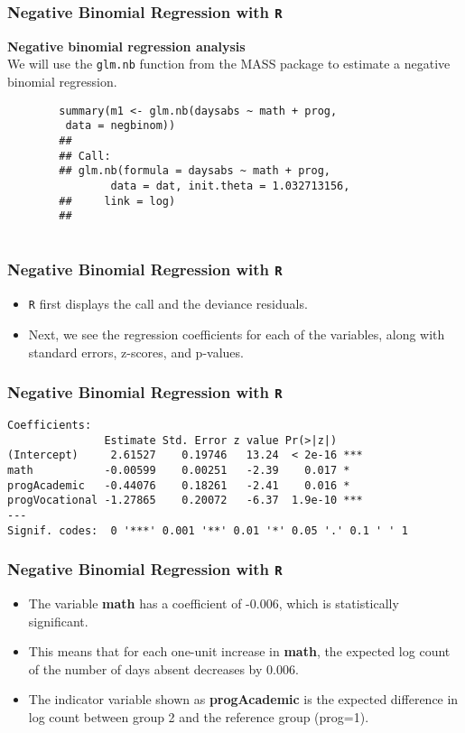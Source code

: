 \documentclass[MASTER.tex]{subfiles}
\begin{document}
\begin{frame}[fragile]
	\frametitle{Negative Binomial Regression with \texttt{R} }
	\large
\textbf{Negative binomial regression analysis}\\
	We will use the \texttt{glm.nb} function from the MASS package to estimate a negative binomial regression.
	\begin{verbatim}
		summary(m1 <- glm.nb(daysabs ~ math + prog, 
		 data = negbinom))
		## 
		## Call:
		## glm.nb(formula = daysabs ~ math + prog, 
		        data = dat, init.theta = 1.032713156, 
		##     link = log)
		## 
		 
\end{verbatim}
\end{frame}
\begin{frame}[fragile]
	\frametitle{Negative Binomial Regression with \texttt{R}}
	\Large
	\vspace{-1cm}
	\begin{itemize}
		\item \texttt{R} first displays the call and the deviance residuals. 
		\item Next, we see the regression coefficients for each of the variables, along with standard errors, z-scores, 
		and p-values. 
	\end{itemize}
\end{frame}
\begin{frame}[fragile]
\frametitle{Negative Binomial Regression with \texttt{R} }
\begin{verbatim} 
Coefficients:
               Estimate Std. Error z value Pr(>|z|)    
(Intercept)     2.61527    0.19746   13.24  < 2e-16 ***
math           -0.00599    0.00251   -2.39    0.017 *  
progAcademic   -0.44076    0.18261   -2.41    0.016 *  
progVocational -1.27865    0.20072   -6.37  1.9e-10 ***
---
Signif. codes:  0 '***' 0.001 '**' 0.01 '*' 0.05 '.' 0.1 ' ' 1
\end{verbatim}

\end{frame}

\begin{frame}[fragile]
	\frametitle{Negative Binomial Regression with \texttt{R} }
	\Large
	\begin{itemize}
		\item The variable \textbf{math} has a coefficient of -0.006, which is statistically significant.
		\item This means that for each one-unit increase in \textbf{math}, the expected log count of the number of days absent decreases by 0.006. 
		\item The indicator variable shown as \textbf{progAcademic} is the expected difference in log count between group 2 and the reference group (prog=1). 
	\end{itemize}
\end{frame}
\end{document}
